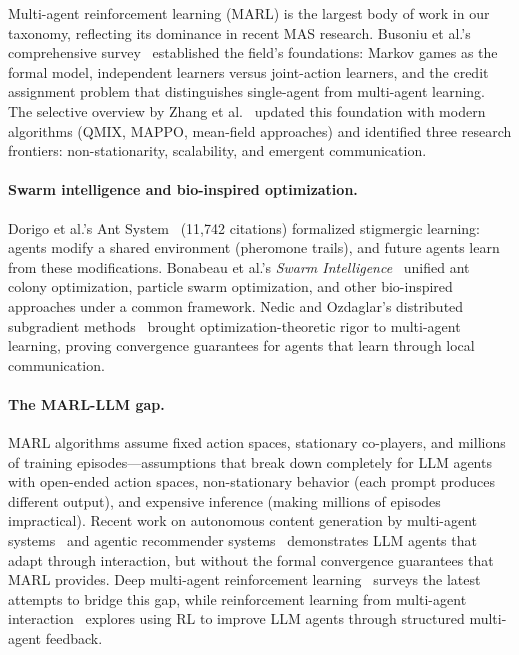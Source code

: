 \documentclass{article}
\begin{document}
%
%
%

Multi-agent reinforcement learning (MARL) is the largest body of work in our
taxonomy, reflecting its dominance in recent MAS research. Busoniu et al.'s
comprehensive survey~\citep{sutra54_comprehensive2008} established the field's
foundations: Markov games as the formal model, independent learners versus joint-action
learners, and the credit assignment problem that distinguishes single-agent from
multi-agent learning. The selective overview by Zhang et
al.~\citep{sutra13849_multiagent2021} updated this foundation with modern algorithms
(QMIX, MAPPO, mean-field approaches) and identified three research frontiers:
non-stationarity, scalability, and emergent communication.

\paragraph{Swarm intelligence and bio-inspired optimization.}
Dorigo et al.'s Ant System~\citep{sutra18255_ant1996} (11,742 citations) formalized
stigmergic learning: agents modify a shared environment (pheromone trails), and
future agents learn from these modifications. Bonabeau et al.'s \emph{Swarm
Intelligence}~\citep{sutra18616_swarm1999} unified ant colony optimization, particle
swarm optimization, and other bio-inspired approaches under a common framework.
Nedic and Ozdaglar's distributed subgradient methods~\citep{sutra13946_distributed2009}
brought optimization-theoretic rigor to multi-agent learning, proving convergence
guarantees for agents that learn through local communication.

\paragraph{The MARL-LLM gap.}
MARL algorithms assume fixed action spaces, stationary co-players, and millions
of training episodes---assumptions that break down completely for LLM agents with
open-ended action spaces, non-stationary behavior (each prompt produces different
output), and expensive inference (making millions of episodes impractical). Recent
work on autonomous content generation by multi-agent
systems~\citep{sutra36062_autonomous2024} and agentic recommender
systems~\citep{sutra8041_future2025} demonstrates LLM agents that adapt through
interaction, but without the formal convergence guarantees that MARL provides. Deep
multi-agent reinforcement learning~\citep{sutra33807_deep2025} surveys
the latest attempts to bridge this gap, while reinforcement learning from multi-agent
interaction~\citep{sutra33388_reinforcement2024} explores using RL to improve LLM
agents through structured multi-agent feedback.
\end{document}
